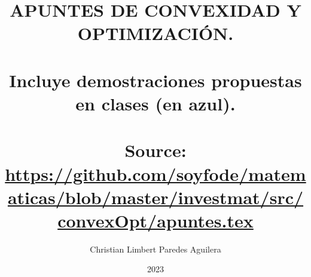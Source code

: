\title{APUNTES DE CONVEXIDAD Y OPTIMIZACIÓN. \\ \hfill\\ \large  Incluye demostraciones propuestas en clases ({\color{blue}en azul}).\\\hfill \\ \small Source: \url{https://github.com/soyfode/matematicas/blob/master/investmat/src/convexOpt/apuntes.tex}}
\author{Christian Limbert Paredes Aguilera}
\date{2023}
